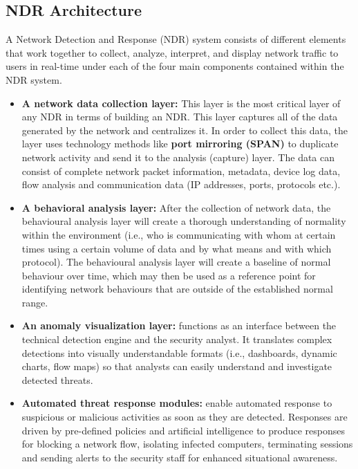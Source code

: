 \documentclass[12pt,a4paper]{report}
\begin{document}
\subsection{NDR Architecture}

A Network Detection and Response (NDR) system consists of different elements that work together to collect, analyze, interpret, and display network traffic to users in real-time under each of the four main components contained within the NDR system.

\begin{itemize}
  \item \textbf{A network data collection layer:} This layer is the most critical layer of any NDR in terms of building an NDR. This layer captures all of the data generated by the network and centralizes it. In order to collect this data, the layer uses technology methods like \textbf{port mirroring (SPAN)} to duplicate network activity and send it to the analysis (capture) layer. The data can consist of complete network packet information, metadata, device log data, flow analysis and communication data (IP addresses, ports, protocols etc.).

  \item \textbf{A behavioral analysis layer:} After the collection of network data, the behavioural analysis layer will create a thorough understanding of normality within the environment (i.e., who is communicating with whom at certain times using a certain volume of data and by what means and with which protocol). The behavioural analysis layer will create a baseline of normal behaviour over time, which may then be used as a reference point for identifying network behaviours that are outside of the established normal range.

  \item \textbf{An anomaly visualization layer:} functions as an interface between the technical detection engine and the security analyst. It translates complex detections into visually understandable formats (i.e., dashboards, dynamic charts, flow maps) so that analysts can easily understand and investigate detected threats.

  \item \textbf{Automated threat response modules:} enable automated response to suspicious or malicious activities as soon as they are detected. Responses are driven by pre-defined policies and artificial intelligence to produce responses for blocking a network flow, isolating infected computers, terminating sessions and sending alerts to the security staff for enhanced situational awareness.
\end{itemize}
\end{document}
